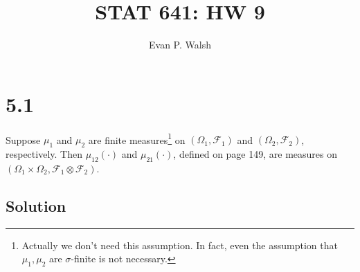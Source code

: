 \documentclass[12pt]{article}
\title{STAT 641: HW 9}
\author{Evan P. Walsh}
\begin{document}
\maketitle

\section*{5.1}
Suppose $\mu_{1}$ and $\mu_{2}$ are finite measures\footnote{Actually we don't need this assumption. In fact, even the assumption that $\mu_{1},
\mu_{2}$ are $\sigma$-finite is not necessary.} on $(\Omega_{1}, \mathcal{F}_{1})$ and $(\Omega_{2}, \mathcal{F}_{2})$, respectively. Then
$\mu_{12}(\cdot)$ and $\mu_{21}(\cdot)$, defined on page 149, are measures on $(\Omega_{1}\times \Omega_{2}, \mathcal{F}_{1}\otimes \mathcal{F}_{2})$.

\subsection*{Solution}
\end{document}
